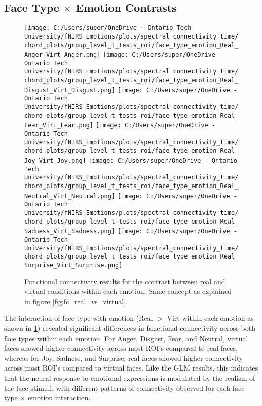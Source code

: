 \subsection{Face Type \texorpdfstring{$\times$}{x} Emotion Contrasts}
\begin{figure}[H]
  \centering
  \texttt{[image: C:/Users/super/OneDrive - Ontario Tech University/fNIRS\_Emotions/plots/spectral\_connectivity\_time/chord\_plots/group\_level\_t\_tests\_roi/face\_type\_emotion\_Real\_Anger\_Virt\_Anger.png]}
  \texttt{[image: C:/Users/super/OneDrive - Ontario Tech University/fNIRS\_Emotions/plots/spectral\_connectivity\_time/chord\_plots/group\_level\_t\_tests\_roi/face\_type\_emotion\_Real\_Disgust\_Virt\_Disgust.png]}
  \texttt{[image: C:/Users/super/OneDrive - Ontario Tech University/fNIRS\_Emotions/plots/spectral\_connectivity\_time/chord\_plots/group\_level\_t\_tests\_roi/face\_type\_emotion\_Real\_Fear\_Virt\_Fear.png]}
  \texttt{[image: C:/Users/super/OneDrive - Ontario Tech University/fNIRS\_Emotions/plots/spectral\_connectivity\_time/chord\_plots/group\_level\_t\_tests\_roi/face\_type\_emotion\_Real\_Joy\_Virt\_Joy.png]}
  \texttt{[image: C:/Users/super/OneDrive - Ontario Tech University/fNIRS\_Emotions/plots/spectral\_connectivity\_time/chord\_plots/group\_level\_t\_tests\_roi/face\_type\_emotion\_Real\_Neutral\_Virt\_Neutral.png]}
  \texttt{[image: C:/Users/super/OneDrive - Ontario Tech University/fNIRS\_Emotions/plots/spectral\_connectivity\_time/chord\_plots/group\_level\_t\_tests\_roi/face\_type\_emotion\_Real\_Sadness\_Virt\_Sadness.png]}
  \texttt{[image: C:/Users/super/OneDrive - Ontario Tech University/fNIRS\_Emotions/plots/spectral\_connectivity\_time/chord\_plots/group\_level\_t\_tests\_roi/face\_type\_emotion\_Real\_Surprise\_Virt\_Surprise.png]}
  \caption[FC: Face Type \texorpdfstring{$\times$}{x} Emotion Contrasts]{Functional connectivity results for the contrast between real and virtual conditions within each emotion.
  Same concept as explained in figure \ref{fig:fc_real_vs_virtual}. }
  \label{fig:fc_real_vs_virtual_emotion_analysis}
\end{figure}

The interaction of face type with emotion (Real $>$ Virt within each emotion as shown in \ref{fig:fc_real_vs_virtual_emotion_analysis}) revealed significant differences in functional connectivity across both face types within each emotion.
For Anger, Disgust, Fear, and Neutral, virtual faces showed higher connectivity across most ROI's compared to real faces, whereas for Joy, Sadness, and Surprise, real faces showed higher connectivity across most ROI's compared to virtual faces.
Like the GLM results, this indicates that the neural response to emotional expressions is modulated by the realism of the face stimuli, with different patterns of connectivity observed for each face type \texorpdfstring{$\times$}{x} emotion interaction.

